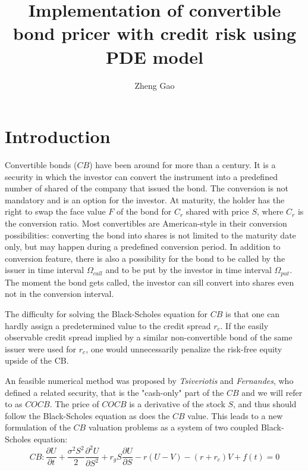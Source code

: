 \documentclass[12pt]{article}
\begin{document}
\title{Implementation of convertible bond pricer with credit risk using PDE model}
\author{Zheng Gao}
\date{}
\maketitle

\section{Introduction\label{sec:intro}}
Convertible bonds ($CB$) have been around for more than a century. It is a security in which the investor can convert the instrument into a predefined number of shared of the company that issued the bond. The conversion is not mandatory and is an option for the investor. At maturity, the holder has the right to swap the face value $F$ of the bond for $C_r$ shared with price $S$, where $C_r$ is the conversion ratio. Most convertibles are American-style in their conversion possibilities: converting the bond into shares is not limited to the maturity date only, but may happen during a predefined conversion period. In addition to conversion feature, there is also a possibility for the bond to be called by the issuer in time interval $\Omega_{call}$ and to be put by the investor in time interval $\Omega_{put}$. The moment the bond gets called, the investor can sill convert into shares even not in the conversion interval. 

The difficulty for solving the Black-Scholes equation for $CB$ is that one can hardly assign a predetermined value to the credit spread $r_c$. If the easily observable credit spread implied by a similar non-convertible bond of the same issuer were used for $r_c$, one would unnecessarily penalize the risk-free equity upside of the CB.

An feasible numerical method was proposed by \textit{Tsiveriotis} and \textit{Fernandes}, who defined a related security, that is the "cash-only" part of the $CB$ and we will refer to as $COCB$. The price of $COCB$ is a derivative of the stock $S$, and thus should follow the Black-Scholes equation as does the $CB$ value. This leads to a new formulation of the $CB$ valuation problems as a system of two coupled Black-Scholes equation:
\begin{equation}
CB: \frac{\partial{U}}{\partial{t}} + 
\frac{\sigma^2S^2}{2}\frac{\partial^2{U}}{\partial{S}^2} + r_gS\frac{\partial{U}}{\partial{S}} - r(U-V) - (r+r_c)V + f(t) = 0 
\label{eq:CB}
\end{equation}
\end{document}
